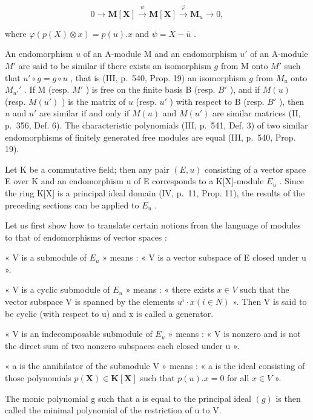 \[
0 \to \mathbf {M} [ \mathbf {X} ] \stackrel {\psi} {\to} \mathbf {M} [ \mathbf {X} ] \stackrel {\varphi} {\to} \mathbf {M} _ {u} \to 0,\tag{1}
\]

where \(\varphi(p(X) \otimes x) = p(u).x\) and \(\psi = X - \bar{u}\) .

An endomorphism \(u\) of an A-module M and an endomorphism \(u'\) of an A-module \(M'\) are said to be similar if there exists an isomorphism \(g\) from M onto \(M'\) such that \(u' \circ g = g \circ u\) , that is (III, p.~540, Prop. 19) an isomorphism \(g\) from \(M_u\) onto \(M_{u'}'\) . If M (resp. \(M'\) ) is free on the finite basis B (resp. \(B'\) ), and if \(M(u)\) (resp. \(M(u')\) ) is the matrix of \(u\) (resp. \(u'\) ) with respect to B (resp. \(B'\) ), then \(u\) and \(u'\) are similar if and only if \(M(u)\) and \(M(u')\) are similar matrices (II, p.~356, Def. 6). The characteristic polynomials (III, p.~541, Def. 3) of two similar endomorphisms of finitely generated free modules are equal (III, p.~540, Prop. 19).

Let K be a commutative field; then any pair \((E, u)\) consisting of a vector space E over K and an endomorphism u of E corresponds to a K{[}X{]}-module \(E_{u}\) . Since the ring K{[}X{]} is a principal ideal domain (IV, p.~11, Prop. 11), the results of the preceding sections can be applied to \(E_{u}\) .

Let us first show how to translate certain notions from the language of modules to that of endomorphisms of vector spaces :

« V is a submodule of \(E_{u}\) » means : « V is a vector subspace of E closed under u ».

« V is a cyclic submodule of \(E_{u}\) » means : « there exists \(x \in V\) such that the vector subspace V is spanned by the elements \(u^{i} \cdot x (i \in N)\) ». Then V is said to be cyclic (with respect to u) and x is called a generator.

« V is an indecomposable submodule of \(E_{u}\) » means : « V is nonzero and is not the direct sum of two nonzero subspaces each closed under u ».

« a is the annihilator of the submodule V » means : « a is the ideal consisting of those polynomials \(p(\mathbf{X}) \in \mathbf{K}[\mathbf{X}]\) such that \(p(u).x = 0\) for all \(x \in V\) ».

The monic polynomial g such that a is equal to the principal ideal \((g)\) is then called the minimal polynomial of the restriction of u to V.

